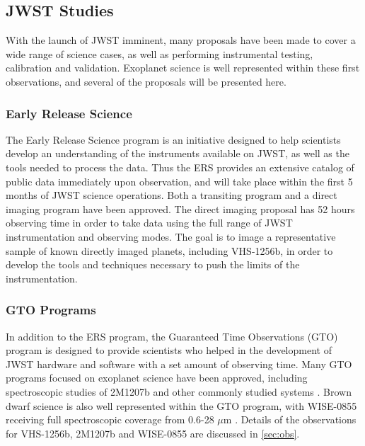 \subsection{JWST Studies}
With the launch of JWST imminent, many proposals have been made to cover a wide range of science cases, as well as performing instrumental testing, calibration and validation.
Exoplanet science is well represented within these first observations, and several of the proposals will be presented here.
\subsubsection{Early Release Science}
The Early Release Science program is an initiative designed to help scientists develop an understanding of the instruments available on JWST, as well as the tools needed to process the data. 
Thus the ERS provides an extensive catalog of public data immediately upon observation, and will take place within the first 5 months of JWST science operations.
Both a transiting program \parencite{Bean2018} and a direct imaging program \parencite{Hinkley2019} have been approved.
The direct imaging proposal has 52 hours observing time in order to take data using the full range of JWST instrumentation and observing modes.
The goal is to image a representative sample of known directly imaged planets, including VHS-1256b, in order to develop the tools and techniques necessary to push the limits of the instrumentation.

\subsubsection{GTO Programs}
In addition to the ERS program, the Guaranteed Time Observations (GTO) program is designed to provide scientists who helped in the development of JWST hardware and software with a set amount of observing time. 
Many GTO programs focused on exoplanet science have been approved, including spectroscopic studies of 2M1207b and other commonly studied systems \parencite{Birkmann2019}.
Brown dwarf science is also well represented within the GTO program, with WISE-0855 receiving full spectroscopic coverage from 0.6-28 $\mu$m \parencite{Oliveira2019}.
Details of the observations for VHS-1256b, 2M1207b and WISE-0855 are discussed in \ref{sec:obs}.

